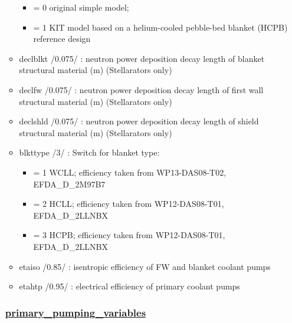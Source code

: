 \documentclass[]{article}
\providecommand{\tightlist}{%
  \setlength{\itemsep}{0pt}\setlength{\parskip}{0pt}}
\begin{document}
\begin{itemize}
\begin{itemize}
    \begin{itemize}
    \tightlist
    \item
      = 0 original simple model;
    \item
      = 1 KIT model based on a helium-cooled pebble-bed blanket (HCPB)
      reference design
    \end{itemize}
  \item
    declblkt /0.075/ : neutron power deposition decay length of blanket
    structural material (m) (Stellarators only)
  \item
    declfw /0.075/ : neutron power deposition decay length of first wall
    structural material (m) (Stellarators only)
  \item
    declshld /0.075/ : neutron power deposition decay length of shield
    structural material (m) (Stellarators only)
  \item
    blkttype /3/ : Switch for blanket type:

    \begin{itemize}
    \tightlist
    \item
      = 1 WCLL; efficiency taken from WP13-DAS08-T02, EFDA\_D\_2M97B7
    \item
      = 2 HCLL; efficiency taken from WP12-DAS08-T01, EFDA\_D\_2LLNBX
    \item
      = 3 HCPB; efficiency taken from WP12-DAS08-T01, EFDA\_D\_2LLNBX
    \end{itemize}
  \item
    etaiso /0.85/ : isentropic efficiency of FW and blanket coolant
    pumps
  \item
    etahtp /0.95/ : electrical efficiency of primary coolant pumps
  \end{itemize}

  \subsubsection{\texorpdfstring{\href{primary_pumping_variables.html}{primary\_pumping\_variables}}{primary\_pumping\_variables}}\label{primary_pumping_variables}


\end{itemize}
\end{document}
